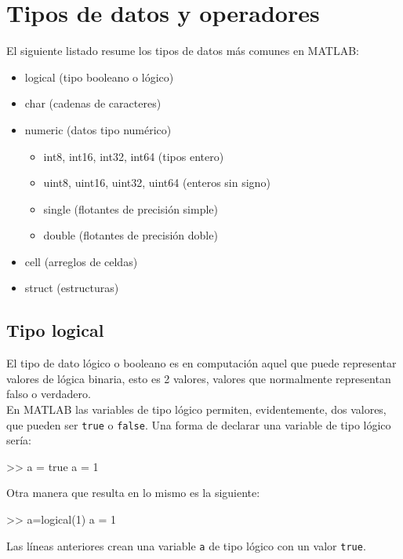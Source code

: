 \section{Tipos de datos y operadores}

El siguiente listado resume los tipos de datos más comunes en MATLAB:

\begin{itemize}
\item logical  (tipo booleano o lógico)
\item char (cadenas de caracteres)
\item numeric (datos tipo numérico)
\begin{itemize}
   \item int8, int16, int32, int64 (tipos entero)
   \item uint8, uint16, uint32, uint64  (enteros sin signo)
   \item single (flotantes de precisión simple)
   \item double  (flotantes de precisión doble)
\end{itemize}
\item cell (arreglos de celdas)
\item struct (estructuras)
\end{itemize}

\subsection{Tipo logical}

El tipo de dato lógico o booleano es en computación aquel que puede 
representar valores de lógica binaria, esto es 2 valores, valores 
que normalmente representan falso o verdadero. \\

En MATLAB las variables de tipo lógico permiten, evidentemente, dos valores, que
pueden ser \texttt{true} o \texttt{false}. Una forma de declarar una
variable de tipo lógico sería:

\begin{matlab}
>> a = true
a =
     1
\end{matlab}

Otra manera que resulta en lo mismo es la siguiente:

\begin{matlab}
>> a=logical(1)
a =
     1
\end{matlab}

Las líneas anteriores crean una variable \texttt{a} de tipo lógico con
un valor \texttt{true}. \\

